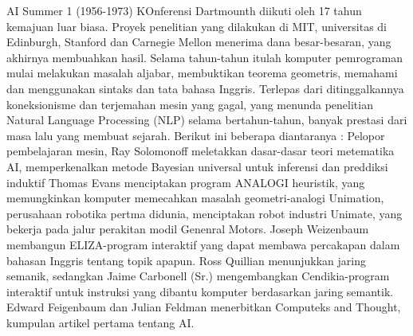 \begin{enumerate}
    AI Summer 1 (1956-1973) KOnferensi Dartmounth diikuti oleh 17 tahun kemajuan luar biasa. Proyek penelitian yang dilakukan di MIT, universitas di Edinburgh, Stanford dan Carnegie Mellon menerima dana besar-besaran, yang akhirnya membuahkan hasil. Selama tahun-tahun itulah komputer pemrograman mulai melakukan masalah aljabar, membuktikan teorema geometris, memahami dan menggunakan sintaks dan tata bahasa Inggris. Terlepas dari ditinggalkannya koneksionisme dan terjemahan mesin yang gagal, yang menunda penelitian Natural Language Processing (NLP) selama bertahun-tahun, banyak prestasi dari masa lalu yang membuat sejarah. Berikut ini beberapa diantaranya : Pelopor pembelajaran mesin, Ray Solomonoff meletakkan dasar-dasar teori metematika AI, memperkenalkan metode Bayesian universal untuk inferensi dan preddiksi induktif Thomas Evans menciptakan program ANALOGI heuristik, yang memungkinkan komputer memecahkan masalah geometri-analogi Unimation, perusahaan robotika pertma didunia, menciptakan robot industri Unimate, yang bekerja pada jalur perakitan modil Genenral Motors. Joseph Weizenbaum membangun ELIZA-program interaktif yang dapat membawa percakapan dalam bahasan Inggris tentang topik apapun. Ross Quillian menunjukkan jaring semanik, sedangkan Jaime Carbonell (Sr.) mengembangkan Cendikia-program interaktif untuk instruksi yang dibantu komputer berdasarkan jaring semantik. Edward Feigenbaum dan Julian Feldman menerbitkan Computeks and Thought, kumpulan artikel pertama tentang AI.

\end{enumerate}

